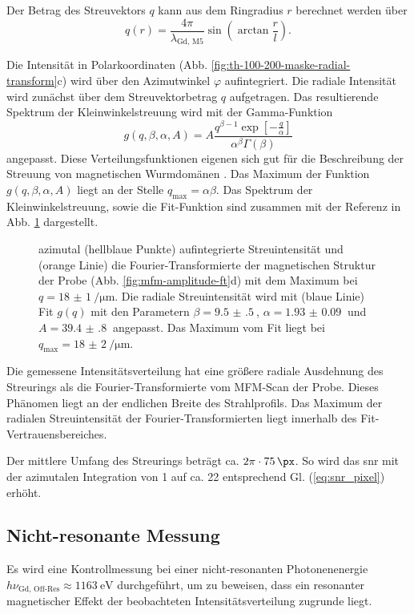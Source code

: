 \noindent
Der Betrag des Streuvektors $q$ kann aus dem Ringradius $r$ berechnet werden über
\begin{equation}
    q(r) = \frac{4\pi}{\lambda_\text{Gd, M5}}\sin\left(\arctan\frac{r}{l}\right).
    \label{eq:streuvektor_von_radius}
\end{equation}

\noindent
Die Intensität in Polarkoordinaten (Abb. \ref{fig:th-100-200-maske-radial-transform}c) wird über den Azimutwinkel $\varphi$ aufintegriert. Die radiale Intensität wird zunächst über dem Streuvektorbetrag $q$  aufgetragen. Das resultierende Spektrum der Kleinwinkelstreuung wird mit der Gamma-Funktion
\begin{equation}
    g(q, \beta, \alpha, A) = A\frac{q^{\beta-1}\exp\left[-\frac{q}{\alpha}\right]}{\alpha^\beta\Gamma(\beta)}
\end{equation}
angepasst. Diese Verteilungsfunktionen eigenen sich gut für die Beschreibung der Streuung von magnetischen Wurmdomänen \cite{bagschik_employing_2016}. Das Maximum der Funktion $g(q, \beta, \alpha, A)$ liegt an der Stelle $q_\text{max} = \alpha\beta$. Das Spektrum der Kleinwinkelstreuung, sowie die Fit-Funktion sind zusammen mit der Referenz in Abb. \ref{fig:radius_fit} dargestellt.
\begin{figure}[H]
    \centering
    
    \caption{azimutal (hellblaue Punkte) aufintegrierte Streuintensität und (orange Linie) die Fourier-Transformierte der magnetischen Struktur der Probe (Abb. \ref{fig:mfm-amplitude-ft}d) mit dem Maximum bei $q =\SI{18(1)}{\per\micro\meter}$. Die radiale Streuintensität wird mit (blaue Linie) Fit $g(q)$ mit den Parametern $\beta = \SI{9.5(5)}{}$, $\alpha = \SI{1.93(9)}{}$ und $A = \SI{39.4(8)}{}$ angepasst. Das Maximum vom Fit liegt bei $q_\text{max} = \SI{18(2)}{\per\micro\meter}$.}
    \label{fig:radius_fit}
\end{figure}
\noindent
Die gemessene Intensitätsverteilung hat eine größere radiale Ausdehnung des Streurings als die Fourier-Transformierte vom MFM-Scan der Probe. Dieses Phänomen liegt an der endlichen Breite des Strahlprofils. Das Maximum der radialen Streuintensität der Fourier-Transformierten liegt innerhalb des Fit-Vertrauensbereiches.

\noindent
Der mittlere Umfang des Streurings beträgt ca. $2\pi\cdot\SI{75}{\px}$. So wird das \gls{snr} mit der azimutalen Integration von 1 auf ca. 22 entsprechend Gl. (\ref{eq:snr_pixel}) erhöht.

\subsection{Nicht-resonante Messung}
Es wird eine Kontrollmessung bei einer nicht-resonanten Photonenenergie $h\nu_{\text{Gd, Off-Res}} \approx \SI{1163}{\eV}$ durchgeführt, um zu beweisen, dass ein resonanter magnetischer Effekt der beobachteten Intensitätsverteilung zugrunde liegt.

